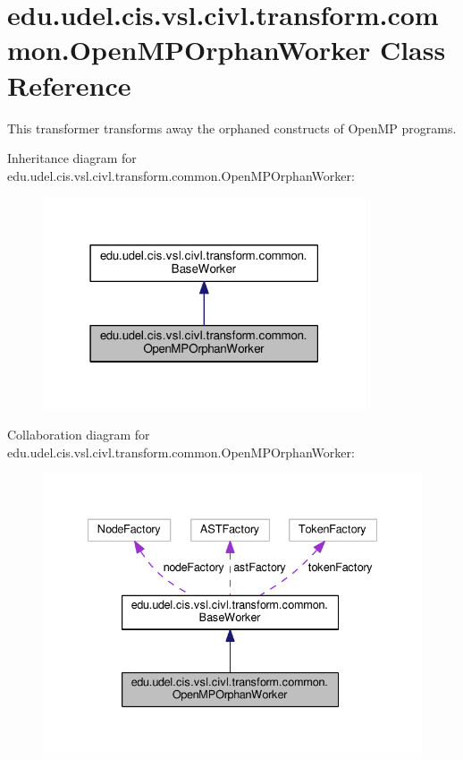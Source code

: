 \hypertarget{classedu_1_1udel_1_1cis_1_1vsl_1_1civl_1_1transform_1_1common_1_1OpenMPOrphanWorker}{}\section{edu.\+udel.\+cis.\+vsl.\+civl.\+transform.\+common.\+Open\+M\+P\+Orphan\+Worker Class Reference}
\label{classedu_1_1udel_1_1cis_1_1vsl_1_1civl_1_1transform_1_1common_1_1OpenMPOrphanWorker}


This transformer transforms away the orphaned constructs of Open\+M\+P programs.  




Inheritance diagram for edu.\+udel.\+cis.\+vsl.\+civl.\+transform.\+common.\+Open\+M\+P\+Orphan\+Worker\+:
\nopagebreak
\begin{figure}[H]
\begin{center}
\leavevmode
\includegraphics[width=271pt]{classedu_1_1udel_1_1cis_1_1vsl_1_1civl_1_1transform_1_1common_1_1OpenMPOrphanWorker__inherit__graph}
\end{center}
\end{figure}


Collaboration diagram for edu.\+udel.\+cis.\+vsl.\+civl.\+transform.\+common.\+Open\+M\+P\+Orphan\+Worker\+:
\nopagebreak
\begin{figure}[H]
\begin{center}
\leavevmode
\includegraphics[width=335pt]{classedu_1_1udel_1_1cis_1_1vsl_1_1civl_1_1transform_1_1common_1_1OpenMPOrphanWorker__coll__graph}
\end{center}
\end{figure}
